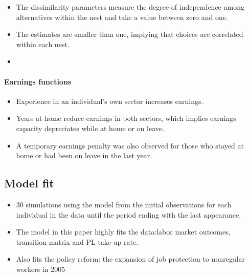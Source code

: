 \documentclass[../root]{subfiles}
\begin{document}
    \begin{itemize}
      \item The dissimilarity parameters measure the degree of independence among alternatives within the nest and take a value between zero and one. \item The estimates are smaller than one, implying that choices are correlated within each nest.
      \item
    \end{itemize}

    \paragraph{Earnings functions}

    \begin{itemize}
      \item Experience in an individual’s own sector increases earnings.
      \item Years at home reduce earnings in both sectors, which implies earnings capacity depreciates while at home or on leave.
      \item A temporary earnings penalty was also observed for those who stayed at home or had been on leave in the last year.
    \end{itemize}

    \subsection{Model fit}

    \begin{itemize}
      \item 30 simulations using the model from the initial observations for each individual in the data until the period ending with the last appearance.
      \item The model in this paper highly fits the data:labor market outcomes, transition matrix and PL take-up rate.
      \item Also fits the policy reform: the expansion of job protection to nonregular workers in 2005
    \end{itemize}
\end{document}
